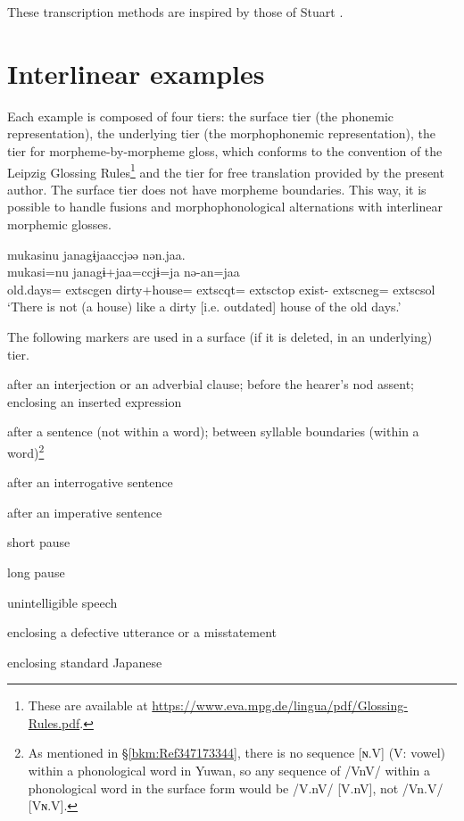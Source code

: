 
These transcription methods are inspired by those of Stuart \citet[7--9, 43--52]{McGill2009}.

\section*{Interlinear examples}

Each example is composed of four tiers: the surface tier (the phonemic representation), the underlying tier (the morphophonemic representation), the tier for morpheme-by-morpheme gloss, which conforms to the convention of the Leipzig Glossing Rules\footnote{These are available at \url{https://www.eva.mpg.de/lingua/pdf/Glossing-Rules.pdf}.} and the tier for free translation provided by the present author. The surface tier does not have morpheme boundaries. This way, it is possible to handle fusions and morphophonological alternations with interlinear morphemic glosses.

\ea
\glll mukasinu janagɨjaaccjəə nən.jaa.\\
      mukasi=nu  janagɨ+jaa=ccjɨ=ja  nə-an=jaa\\
      old.days=	extsc{gen} dirty+house=	extsc{qt}=	extsc{top} exist-	extsc{neg}=	extsc{sol}\\
\glt  ‘There is not (a house) like a dirty [i.e. outdated] house of the old days.’
\z 

The following markers are used in a surface (if it is deleted, in an underlying) tier.

\begin{description}[font=\normalfont]
\item[,]  after an interjection or an adverbial clause; before the hearer’s nod assent; enclosing an inserted expression
\item[.]  after a sentence (not within a word); between syllable boundaries (within a word)\footnote{As mentioned in §\ref{bkm:Ref347173344}, there is no sequence [ɴ.V] (V: vowel) within a phonological word in Yuwan, so any sequence of /VnV/ within a phonological word in the surface form would be /V.nV/ [V.nV], not /Vn.V/ [Vɴ.V].}
\item[?]  after an interrogative sentence
\item[!]  after an imperative sentence
\item[..]  short pause
\item[...]  long pause
\item[xxx]  unintelligible speech
\item[(  )] enclosing a defective utterance or a misstatement
\item[{\textbar}  {\textbar}]  enclosing standard Japanese
\end{description} 

